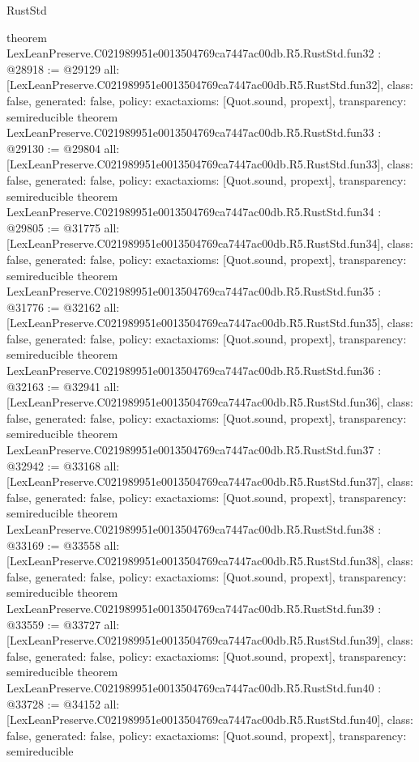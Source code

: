 \begin{lexlean}{RustStd}
\begin{coremodule}
{}
theorem LexLeanPreserve.C021989951e0013504769ca7447ac00db.R5.RustStd.fun32 : @28918 := @29129 {
  all: [LexLeanPreserve.C021989951e0013504769ca7447ac00db.R5.RustStd.fun32],
  class: false,
  generated: false,
  policy: exact{axioms: [Quot.sound, propext]},
  transparency: semireducible
}
theorem LexLeanPreserve.C021989951e0013504769ca7447ac00db.R5.RustStd.fun33 : @29130 := @29804 {
  all: [LexLeanPreserve.C021989951e0013504769ca7447ac00db.R5.RustStd.fun33],
  class: false,
  generated: false,
  policy: exact{axioms: [Quot.sound, propext]},
  transparency: semireducible
}
theorem LexLeanPreserve.C021989951e0013504769ca7447ac00db.R5.RustStd.fun34 : @29805 := @31775 {
  all: [LexLeanPreserve.C021989951e0013504769ca7447ac00db.R5.RustStd.fun34],
  class: false,
  generated: false,
  policy: exact{axioms: [Quot.sound, propext]},
  transparency: semireducible
}
theorem LexLeanPreserve.C021989951e0013504769ca7447ac00db.R5.RustStd.fun35 : @31776 := @32162 {
  all: [LexLeanPreserve.C021989951e0013504769ca7447ac00db.R5.RustStd.fun35],
  class: false,
  generated: false,
  policy: exact{axioms: [Quot.sound, propext]},
  transparency: semireducible
}
theorem LexLeanPreserve.C021989951e0013504769ca7447ac00db.R5.RustStd.fun36 : @32163 := @32941 {
  all: [LexLeanPreserve.C021989951e0013504769ca7447ac00db.R5.RustStd.fun36],
  class: false,
  generated: false,
  policy: exact{axioms: [Quot.sound, propext]},
  transparency: semireducible
}
theorem LexLeanPreserve.C021989951e0013504769ca7447ac00db.R5.RustStd.fun37 : @32942 := @33168 {
  all: [LexLeanPreserve.C021989951e0013504769ca7447ac00db.R5.RustStd.fun37],
  class: false,
  generated: false,
  policy: exact{axioms: [Quot.sound, propext]},
  transparency: semireducible
}
theorem LexLeanPreserve.C021989951e0013504769ca7447ac00db.R5.RustStd.fun38 : @33169 := @33558 {
  all: [LexLeanPreserve.C021989951e0013504769ca7447ac00db.R5.RustStd.fun38],
  class: false,
  generated: false,
  policy: exact{axioms: [Quot.sound, propext]},
  transparency: semireducible
}
theorem LexLeanPreserve.C021989951e0013504769ca7447ac00db.R5.RustStd.fun39 : @33559 := @33727 {
  all: [LexLeanPreserve.C021989951e0013504769ca7447ac00db.R5.RustStd.fun39],
  class: false,
  generated: false,
  policy: exact{axioms: [Quot.sound, propext]},
  transparency: semireducible
}
theorem LexLeanPreserve.C021989951e0013504769ca7447ac00db.R5.RustStd.fun40 : @33728 := @34152 {
  all: [LexLeanPreserve.C021989951e0013504769ca7447ac00db.R5.RustStd.fun40],
  class: false,
  generated: false,
  policy: exact{axioms: [Quot.sound, propext]},
  transparency: semireducible
}
\end{coremodule}
\end{lexlean}
